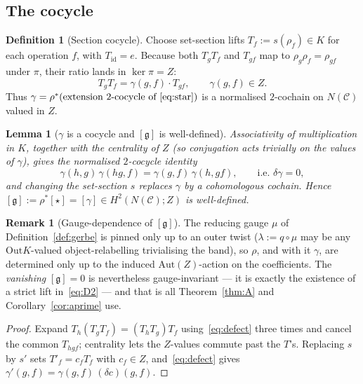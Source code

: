 \documentclass[11pt]{article}
\newtheorem{lemma}[theorem]{Lemma}
\theoremstyle{definition}
\newtheorem{definition}[theorem]{Definition}
\newtheorem{remark}[theorem]{Remark}
\newcommand{\C}{\mathcal{C}}
\newcommand{\id}{\mathrm{id}}
\newcommand{\Aut}{\mathrm{Aut}}
\newcommand{\Out}{\mathrm{Out}}
\newcommand{\Zc}{Z}
\newcommand{\gerbe}{\mathfrak{g}}
\begin{document}
\subsection{The cocycle}

\begin{definition}[Section cocycle]\label{def:cocycle}
Choose set-section lifts $T_f:=s(\rho_f)\in K$ for each operation $f$, with $T_{\id}=e$. Because
both $T_gT_f$ and $T_{gf}$ map to $\rho_g\rho_f=\rho_{gf}$ under $\pi$, their ratio lands in
$\ker\pi=\Zc$:
\begin{equation}\label{eq:defect}
T_gT_f=\gamma(g,f)\cdot T_{gf},\qquad \gamma(g,f)\in\Zc.
\tag{$\dagger$}
\end{equation}
Thus $\gamma=\rho^*(\text{extension $2$-cocycle of~\eqref{eq:star}})$ is a normalised
$2$-cochain on $N(\C)$ valued in $\Zc$.
\end{definition}

\begin{lemma}[{$\gamma$ is a cocycle and $[\gerbe]$ is well-defined}]\label{lem:cocycle}
Associativity of multiplication in $K$, together with the centrality of $\Zc$ (so conjugation acts
trivially on the values of $\gamma$), gives the normalised $2$-cocycle identity
\[
\gamma(h,g)\,\gamma(hg,f)=\gamma(g,f)\,\gamma(h,gf),\qquad\text{i.e.\ } \delta\gamma=0,
\]
and changing the set-section $s$ replaces $\gamma$ by a cohomologous cochain. Hence
$[\gerbe]:=\rho^*[\star]=[\gamma]\in H^2(N(\C);\Zc)$ is well-defined.
\end{lemma}

\begin{remark}[{Gauge-dependence of $[\gerbe]$}]\label{rem:gauge}
The reducing gauge $\mu$ of Definition~\ref{def:gerbe} is pinned only up to an outer twist
($\lambda:=q\circ\mu$ may be any $\Out K$-valued object-relabelling trivialising the band), so
$\rho$, and with it $\gamma$, are determined only up to the induced $\Aut(\Zc)$-action on the
coefficients. The \emph{vanishing} $[\gerbe]=0$ is nevertheless gauge-invariant --- it is exactly
the existence of a strict lift in~\eqref{eq:D2} --- and that is all Theorem~\ref{thm:A} and
Corollary~\ref{cor:aprime} use.
\end{remark}

\begin{proof}
Expand $T_h(T_gT_f)=(T_hT_g)T_f$ using~\eqref{eq:defect} three times and cancel the common
$T_{hgf}$; centrality lets the $\Zc$-values commute past the $T$'s. Replacing $s$ by $s'$ sets
$T'_f=c_fT_f$ with $c_f\in\Zc$, and~\eqref{eq:defect} gives
$\gamma'(g,f)=\gamma(g,f)\,(\delta c)(g,f)$.
\end{proof}
\end{document}
